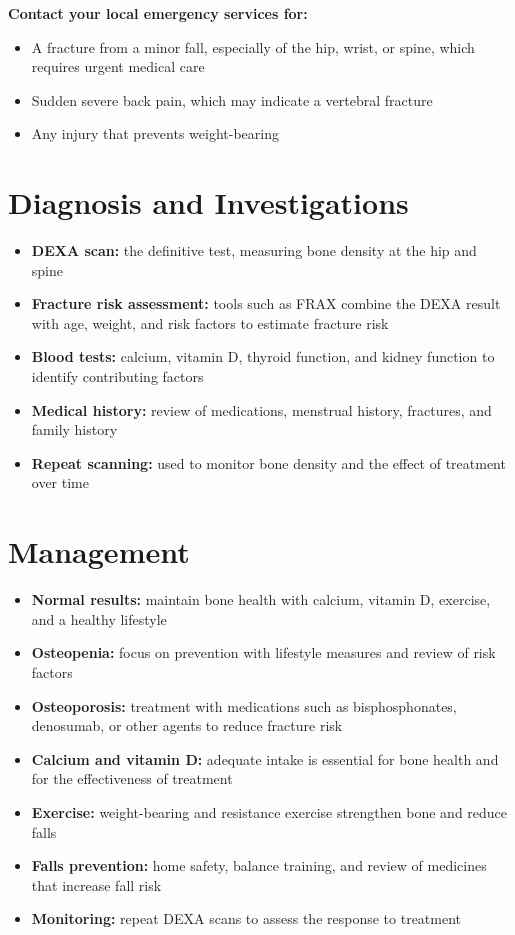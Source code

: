 \textbf{Contact your local emergency services for:}
\begin{itemize}
    \item A fracture from a minor fall, especially of the hip, wrist, or spine, which requires urgent medical care
    \item Sudden severe back pain, which may indicate a vertebral fracture
    \item Any injury that prevents weight-bearing
\end{itemize}

\section*{Diagnosis and Investigations}
\begin{itemize}
    \item \textbf{DEXA scan:} the definitive test, measuring bone density at the hip and spine
    \item \textbf{Fracture risk assessment:} tools such as FRAX combine the DEXA result with age, weight, and risk factors to estimate fracture risk
    \item \textbf{Blood tests:} calcium, vitamin D, thyroid function, and kidney function to identify contributing factors
    \item \textbf{Medical history:} review of medications, menstrual history, fractures, and family history
    \item \textbf{Repeat scanning:} used to monitor bone density and the effect of treatment over time
\end{itemize}

\section*{Management}
\begin{itemize}
    \item \textbf{Normal results:} maintain bone health with calcium, vitamin D, exercise, and a healthy lifestyle
    \item \textbf{Osteopenia:} focus on prevention with lifestyle measures and review of risk factors
    \item \textbf{Osteoporosis:} treatment with medications such as bisphosphonates, denosumab, or other agents to reduce fracture risk
    \item \textbf{Calcium and vitamin D:} adequate intake is essential for bone health and for the effectiveness of treatment
    \item \textbf{Exercise:} weight-bearing and resistance exercise strengthen bone and reduce falls
    \item \textbf{Falls prevention:} home safety, balance training, and review of medicines that increase fall risk
    \item \textbf{Monitoring:} repeat DEXA scans to assess the response to treatment
\end{itemize}

